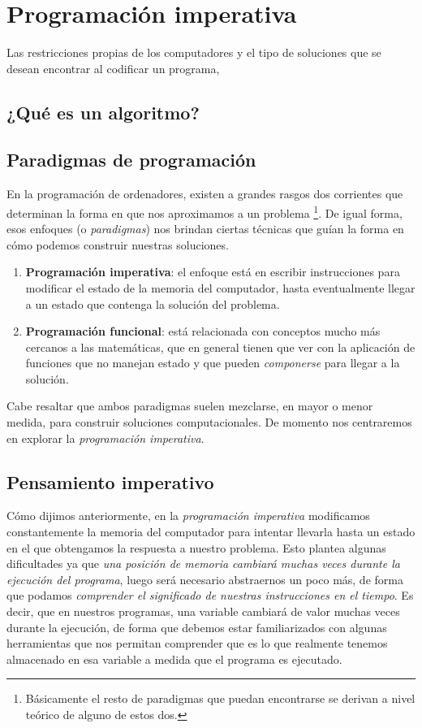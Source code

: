 \chapter{Programación imperativa}
 
Las restricciones propias de los computadores y el tipo de soluciones que se desean encontrar al codificar un programa, 

\section{¿Qué es un algoritmo?}

\newpage


\section{Paradigmas de programación}

En la programación de ordenadores, existen a grandes rasgos dos corrientes que determinan la forma en que nos aproximamos a un problema \footnote{Básicamente el resto de paradigmas que puedan encontrarse se derivan a nivel teórico de alguno de estos dos.}. De igual forma, esos enfoques (o \emph{paradigmas}) nos brindan ciertas técnicas que guían la forma en cómo podemos construir nuestras soluciones.

\begin{enumerate}
\item \textbf{Programación imperativa}: el enfoque está en escribir instrucciones para modificar el estado de la memoria del computador, hasta eventualmente llegar a un estado que contenga la solución del problema.

\item \textbf{Programación funcional}: está relacionada con conceptos mucho más cercanos a las matemáticas, que en general tienen que ver con la aplicación de funciones que no manejan estado y que pueden \emph{componerse} para llegar a la solución.
\end{enumerate}

Cabe resaltar que ambos paradigmas suelen mezclarse, en mayor o menor medida, para construir soluciones computacionales. De momento nos centraremos en explorar la \emph{programación imperativa}.

\section{Pensamiento imperativo}

Cómo dijimos anteriormente, en la \emph{programación imperativa} modificamos constantemente la memoria del computador para intentar llevarla hasta un estado en el que obtengamos la respuesta a nuestro problema. Esto plantea algunas dificultades ya que \emph{una posición de memoria cambiará muchas veces durante la ejecución del programa}, luego será necesario abstraernos un poco más, de forma que podamos \emph{comprender el significado de nuestras instrucciones en el tiempo}. Es decir, que en nuestros programas, una variable cambiará de valor muchas veces durante la ejecución, de forma que debemos estar familiarizados con algunas herramientas que nos permitan comprender que es lo que realmente tenemos almacenado en esa variable a medida que el programa es ejecutado.

